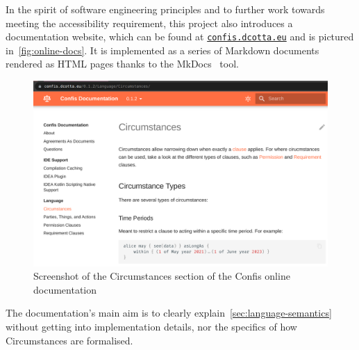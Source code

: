 In the spirit of software engineering principles and to further work towards meeting the accessibility requirement, this project also introduces a documentation website, which can be found at \href{https://confis.dcotta.eu}{\texttt{confis.dcotta.eu}} and is pictured in~\autoref{fig:online-docs}.
It is implemented as a series of Markdown documents rendered as HTML pages thanks to the MkDocs~\cite{mkDocs} tool.

\begin{figure}[h]
    \centering
    \includegraphics[width=\textwidth]{figures/online-docs}
    \caption{Screenshot of the Circumstances section of the Confis online documentation}
    \label{fig:online-docs}
\end{figure}

The documentation's main aim is to clearly explain~\autoref{sec:language-semantics} without getting into implementation details, nor the specifics of how Circumstances are formalised.


